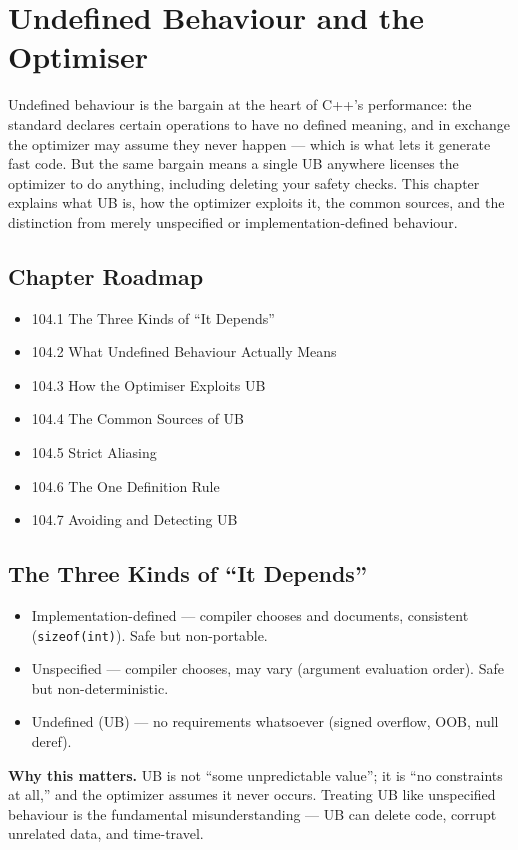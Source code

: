 \chapter{Undefined Behaviour and the Optimiser}

Undefined behaviour is the bargain at the heart of C++'s performance: the standard declares certain operations to have no defined meaning, and in exchange the optimizer may assume they never happen --- which is what lets it generate fast code. But the same bargain means a single UB anywhere licenses the optimizer to do anything, including deleting your safety checks. This chapter explains what UB is, how the optimizer exploits it, the common sources, and the distinction from merely unspecified or implementation-defined behaviour.

\section*{Chapter Roadmap}
\begin{itemize}
\item 104.1 The Three Kinds of ``It Depends''
\item 104.2 What Undefined Behaviour Actually Means
\item 104.3 How the Optimiser Exploits UB
\item 104.4 The Common Sources of UB
\item 104.5 Strict Aliasing
\item 104.6 The One Definition Rule
\item 104.7 Avoiding and Detecting UB
\end{itemize}

\section{The Three Kinds of ``It Depends''}
\begin{itemize}
\item Implementation-defined --- compiler chooses and documents, consistent (\texttt{sizeof(int)}). Safe but non-portable.
\item Unspecified --- compiler chooses, may vary (argument evaluation order). Safe but non-deterministic.
\item Undefined (UB) --- no requirements whatsoever (signed overflow, OOB, null deref).
\end{itemize}

\textbf{Why this matters.} UB is not ``some unpredictable value''; it is ``no constraints at all,'' and the optimizer assumes it never occurs. Treating UB like unspecified behaviour is the fundamental misunderstanding --- UB can delete code, corrupt unrelated data, and time-travel.

